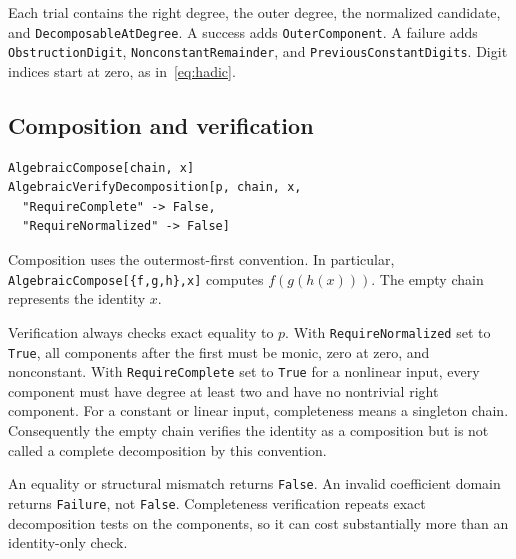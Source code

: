 \documentclass[11pt,letterpaper]{article}
\theoremstyle{definition}
\theoremstyle{remark}
\newcommand{\wt}[1]{\texttt{#1}}
\begin{document}
Each trial contains the right degree, the outer degree, the normalized
candidate, and \wt{DecomposableAtDegree}. A success adds
\wt{OuterComponent}. A failure adds \wt{ObstructionDigit},
\wt{NonconstantRemainder}, and \wt{PreviousConstantDigits}. Digit
indices start at zero, as in~\eqref{eq:hadic}.

\subsection{Composition and verification}
\begin{lstlisting}
AlgebraicCompose[chain, x]
AlgebraicVerifyDecomposition[p, chain, x,
  "RequireComplete" -> False,
  "RequireNormalized" -> False]
\end{lstlisting}
Composition uses the outermost-first convention. In particular,
\wt{AlgebraicCompose[\{f,g,h\},x]} computes $f(g(h(x)))$.
The empty chain represents the identity $x$.

Verification always checks exact equality to $p$. With
\wt{RequireNormalized} set to \wt{True}, all components after the
first must be monic, zero at zero, and nonconstant. With
\wt{RequireComplete} set to \wt{True} for a nonlinear input, every
component must have degree at least two and have no nontrivial right
component. For a constant or linear input, completeness means a singleton
chain. Consequently the empty chain verifies the identity as a composition
but is not called a complete decomposition by this convention.

An equality or structural mismatch returns \wt{False}. An invalid
coefficient domain returns \wt{Failure}, not \wt{False}. Completeness
verification repeats exact decomposition tests on the components, so it
can cost substantially more than an identity-only check.
\end{document}
